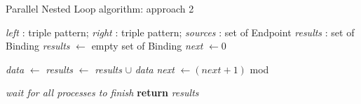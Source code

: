 \begin{algorithm}[h]
    \caption{Parallel Nested Loop algorithm: approach 2}\label{algo:pnl}
    \begin{algorithmic}[1]
        \Require \textit{left} : triple pattern; \textit{right} : triple pattern; \textit{sources} : set of Endpoint
        \Ensure \textit{results} : set of Binding
            \State \textit{results} $\gets$ empty set of Binding
            \State \textit{next} $\gets 0$

             
                \State \textit{data} $\gets$ 
                \State \textit{results} $\gets$ \textit{results} $\cup$ \textit{data}
                \State \textit{next} $\gets (\textit{next} + 1)$ mod 
            \EndFor

            \State \emph{wait for all processes to finish}
            \State \textbf{return} \textit{results}
        \EndFunction
    \end{algorithmic}
\end{algorithm}
